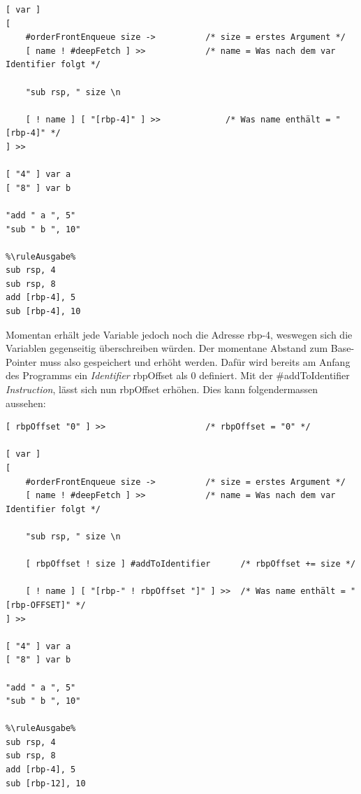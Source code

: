 \begin{lstlisting}[language=QHS, caption=Definition einer Variable mit {\selectListingFont var} \textit{Identifier}]
%\ruleEingabe%
[ var ]
[
    #orderFrontEnqueue size ->          /* size = erstes Argument */
    [ name ! #deepFetch ] >>            /* name = Was nach dem var Identifier folgt */

    "sub rsp, " size \n

    [ ! name ] [ "[rbp-4]" ] >>             /* Was name enthält = "[rbp-4]" */
] >> 

[ "4" ] var a 
[ "8" ] var b 

"add " a ", 5"
"sub " b ", 10"
    
%\ruleAusgabe%
sub rsp, 4
sub rsp, 8
add [rbp-4], 5
sub [rbp-4], 10
\end{lstlisting}

Momentan erhält jede Variable jedoch noch die Adresse {\selectListingFont rbp-4}, weswegen sich die Variablen gegenseitig überschreiben würden. Der momentane Abstand zum Base-Pointer muss also gespeichert und erhöht werden.
Dafür wird bereits am Anfang des Programms ein \textit{Identifier} {\selectListingFont rbpOffset} als 0 definiert.
Mit der {\listingFont\selectfont \#addToIdentifier} \textit{Instruction}, lässt sich nun {\selectListingFont rbpOffset} erhöhen. Dies kann folgendermassen aussehen:

\begin{minipage}{\linewidth}
\begin{lstlisting}[language=QHS, label=eg:qhs-vardefinition, caption=Definition einer Variable mit rbpOffset]
%\ruleEingabe%
[ rbpOffset "0" ] >>                    /* rbpOffset = "0" */

[ var ]
[
    #orderFrontEnqueue size ->          /* size = erstes Argument */
    [ name ! #deepFetch ] >>            /* name = Was nach dem var Identifier folgt */

    "sub rsp, " size \n

    [ rbpOffset ! size ] #addToIdentifier      /* rbpOffset += size */

    [ ! name ] [ "[rbp-" ! rbpOffset "]" ] >>  /* Was name enthält = "[rbp-OFFSET]" */
] >> 

[ "4" ] var a 
[ "8" ] var b 

"add " a ", 5"
"sub " b ", 10"
    
%\ruleAusgabe%
sub rsp, 4
sub rsp, 8
add [rbp-4], 5
sub [rbp-12], 10
\end{lstlisting}
\end{minipage}

